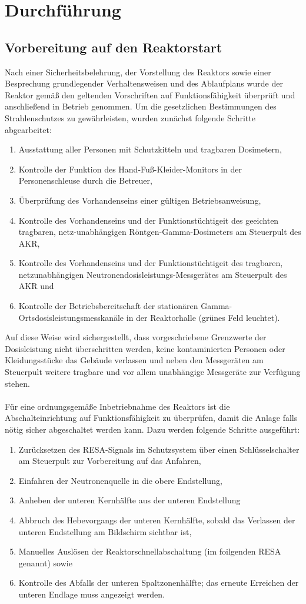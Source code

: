 \documentclass[german,  %
parskip=full,  %
]{scrartcl}
\begin{document}
\section{Durchführung}
\subsection{Vorbereitung auf den Reaktorstart}
Nach einer Sicherheitsbelehrung, der Vorstellung des Reaktors sowie einer Besprechung grundlegender Verhaltensweisen und des Ablaufplans wurde der Reaktor gemäß den geltenden Vorschriften auf Funktionsfähigkeit überprüft und anschließend in Betrieb genommen. Um die gesetzlichen Bestimmungen des Strahlenschutzes zu gewährleisten, wurden zunächst folgende Schritte abgearbeitet:
\begin{enumerate}
\item Ausstattung aller Personen mit Schutzkitteln und tragbaren Dosimetern,
\item Kontrolle der Funktion des Hand-Fuß-Kleider-Monitors in der Personenschleuse durch die Betreuer,
\item Überprüfung des Vorhandenseins einer gültigen Betriebsanweisung,
\item Kontrolle des Vorhandenseins und der Funktionstüchtigeit des geeichten tragbaren, netz-unabhängigen Röntgen-Gamma-Dosimeters am Steuerpult des AKR,
\item Kontrolle des Vorhandenseins und der Funktionstüchtigeit des tragbaren, netzunabhängigen Neutronendosisleistungs-Messgerätes am Steuerpult des AKR und
\item Kontrolle der Betriebsbereitschaft der stationären Gamma-Ortsdosisleistungsmesskanäle in der Reaktorhalle (grünes Feld leuchtet).
\end{enumerate}
Auf diese Weise wird sichergestellt, dass vorgeschriebene Grenzwerte der Dosisleistung nicht überschritten werden, keine kontaminierten Personen oder Kleidungsstücke das Gebäude verlassen und neben den Messgeräten am Steuerpult weitere tragbare und vor allem unabhängige Messgeräte zur Verfügung stehen. \\\\
Für eine ordnungsgemäße Inbetriebnahme des Reaktors ist die Abschalteinrichtung auf Funktionsfähigkeit zu überprüfen, damit die Anlage falls nötig sicher abgeschaltet werden kann. Dazu werden folgende Schritte ausgeführt:
\begin{enumerate}
\item Zurücksetzen des RESA-Signals im Schutzsystem über einen Schlüsselschalter am Steuerpult zur Vorbereitung auf das Anfahren,
\item Einfahren der Neutronenquelle in die obere Endstellung,
\item Anheben der unteren Kernhälfte aus der unteren Endstellung
\item Abbruch des Hebevorgangs der unteren Kernhälfte, sobald das Verlassen der unteren Endstellung am Bildschirm sichtbar ist,
\item Manuelles Auslösen der Reaktorschnellabschaltung (im foilgenden RESA genannt) sowie
\item Kontrolle des Abfalls der unteren Spaltzonenhälfte; das erneute Erreichen der unteren Endlage muss angezeigt werden.
\end{enumerate} 
\end{document}
